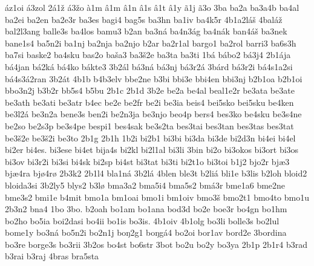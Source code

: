 {    áz1oi
    á3zol
    2á1ž
    á3žo
    à1m
    â1m
    â1n
    â1s
    â1t
    â1y
    ã1j
    ã3o
    3ba
    ba2a
    ba3a4b
    ba4al
    ba2ei
    ba2en
    ba2e3r
    ba3es
    bagi4
    bag5s
    ba3hn
    ba1iv
    ba4k5r
    4b1a2láš
    4baláž
    bal2l3ang
    balle3s
    ba4los
    bamu3
    b2an
    ba3ná
    ba4n3ág
    ba4nák
    ban4áš
    ba3nek
    bane1s4
    ba5n2i
    ba1nj
    ba2nja
    ba2njo
    b2ar
    ba2r1al
    bargo1
    ba2rol
    barri3
    ba6s3h
    ba7si
    baske2
    ba4sku
    bas2o
    baša3
    ba3š2e
    ba3ta
    ba3ti
    1bá
    bábo2
    bá3j4
    2b1ája
    bá4jan
    bá2ká
    bá4ko
    bákte3
    3b2ál
    bá3ná
    bá3nj
    bá3r2á
    3bárd
    bá3r2i
    bá4s1a2si
    bá4s3á2ran
    3b2át
    4b1b
    b4b3elv
    bbe2ne
    b3bi
    bbi3e
    bbi4en
    bbi3nj
    b2b1oa
    b2b1oi
    bbo3n2j
    b3b2r
    bb5s4
    b5bu
    2b1c
    2b1d
    3b2e
    be2a
    be4al
    beal1e2r
    be3ata
    be3ate
    be3ath
    be3ati
    be3atr
    b4ec
    be2e
    be2fr
    be2i
    be3ia
    beis4
    bei5sko
    bei5sku
    be4ken
    be3l2á
    be3n2a
    bene3s
    ben2i
    be2n3ja
    be3njo
    beo4p
    bers4
    bes3ko
    be4sku
    be3s4ne
    be2so
    be2s3p
    be3s4pe
    bespi1
    bes4sak
    be3s2ta
    bes3tai
    bes3tan
    bes3tas
    bes3tat
    be3š2e
    be3š2i
    be3to
    2b1g
    2b1h
    1b2i
    bi2b1
    bi3bi
    bi3da
    bi3de
    bi2d3n
    bi4ei
    bi4el
    bi2er
    bi4es.
    bi3ese
    bi4et
    bija4s
    bi2kl
    bi2l1al
    bi3li
    3bin
    bi2o
    bi3okos
    bi3ort
    bi3os
    bi3ov
    bi3r2i
    bi3si
    bi4sk
    bi2sp
    bi4st
    bi3tat
    bi3ti
    bi2t1o
    bi3toi
    b1j2
    bjo2r
    bjæ3
    bjæ4ra
    bjø4rø
    2b3k2
    2b1l4
    bla1ná
    3b2lá
    4blen
    ble3t
    b2liá
    bli1e
    b3lis
    b2loh
    bloid2
    bloida3si
    3b2ly5
    blys2
    b3lø
    bma3a2
    bma5i4
    bma5s2
    bmá3r
    bme1a6
    bme2ne
    bme3s2
    bmi1e
    b4mit
    bmo1a
    bm1oai
    bmo1i
    bm1oiv
    bmo3š
    bmo2t1
    bmo4to
    bmo1u
    2b3n2
    bna4
    1bo
    3bo.
    b2oah
    bo1am
    bo1ana
    bod3d
    bo2e
    boe3r
    bo4gn
    bo1hm
    bo2ho
    bo5ia
    boi2dasi
    bo4ii
    bo1is
    bo3is.
    4b1oiv
    4b1olg
    bo3li
    bolle3s
    bo2lul
    bome1y
    bo3ná
    bo5n2i
    bo2n1j
    boŋ2g1
    boŋgá4
    bo2oi
    bor1av
    bord2e
    3bordina
    bo3re
    borge3s
    bo3rii
    3b2os
    bo4st
    bo6str
    3bot
    bo2u
    bo2y
    bo3ya
    2b1p
    2b1r4
    b3rad
    b3rai
    b3raj
    4bras
    bra5sta
}
